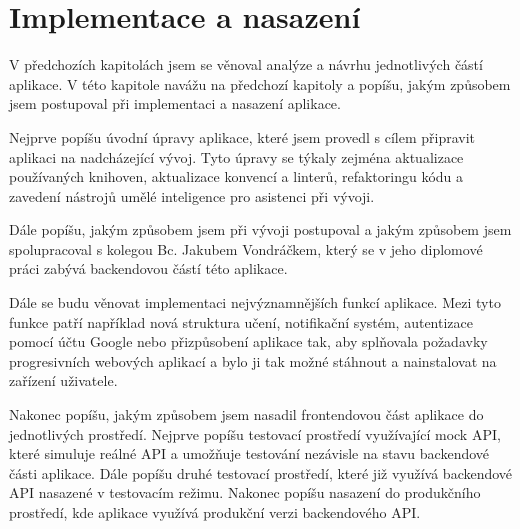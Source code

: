 \chapter{Implementace a nasazení}


V předchozích kapitolách jsem se věnoval analýze a návrhu jednotlivých částí aplikace. V této kapitole navážu na předchozí kapitoly a popíšu, jakým způsobem jsem postupoval při implementaci a nasazení aplikace.

Nejprve popíšu úvodní úpravy aplikace, které jsem provedl s cílem připravit aplikaci na nadcházející vývoj. Tyto úpravy se týkaly zejména aktualizace používaných knihoven, aktualizace konvencí a linterů, refaktoringu kódu a zavedení nástrojů umělé inteligence pro asistenci při vývoji.

Dále popíšu, jakým způsobem jsem při vývoji postupoval a jakým způsobem jsem spolupracoval s kolegou Bc. Jakubem Vondráčkem, který se v jeho diplomové práci zabývá backendovou částí této aplikace.

Dále se budu věnovat implementaci nejvýznamnějších funkcí aplikace. Mezi tyto funkce patří například nová struktura učení, notifikační systém, autentizace pomocí účtu Google nebo přizpůsobení aplikace tak, aby splňovala požadavky progresivních webových aplikací a bylo ji tak možné stáhnout a nainstalovat na zařízení uživatele.

Nakonec popíšu, jakým způsobem jsem nasadil frontendovou část aplikace do jednotlivých prostředí. Nejprve popíšu testovací prostředí využívající mock API, které simuluje reálné API a umožňuje testování nezávisle na stavu backendové části aplikace. Dále popíšu druhé testovací prostředí, které již využívá backendové API nasazené v testovacím režimu. Nakonec popíšu nasazení do produkčního prostředí, kde aplikace využívá produkční verzi backendového API.   
